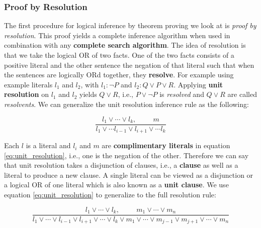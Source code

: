 

\subsubsection{Proof by Resolution}


The first procedure for logical inference by theorem proving we look at is \textit{proof by resolution}. This proof yields a complete inference algorithm when used in combination with any \textbf{complete search algorithm}. The idea of resolution is that we take the logical \textsc{OR} of two facts. One of the two facts consists of a positive literal and the other sentence the negation of that literal such that when the sentences are logically \textsc{OR}d together, they \textbf{resolve}.
For example using example literals $l_1$ and $l_2$, with $l_1: \neg P$ and $l_2: Q \vee P \vee R$. Applying \textbf{unit resolution} on $l_1$ and $l_2$ yields $Q \vee R$, i.e., $P \vee \neg P$ is \textit{resolved} and $Q \vee R$ are called \textit{resolvents}.
We can generalize the unit resolution inference rule as the following:

\begin{equation}
	\dfrac{l_1 \vee \cdots \vee l_k,\hspace{1cm}  m}{l_1 \vee \cdots l_{i-1} \vee l_{i+1} \vee \cdots l_k}
	\label{eq:unit_resolution}
\end{equation}

Each $l$ is a literal and $l_i$ and $m$ are \textbf{complimentary literals} in equation \ref{eq:unit_resolution}, i.e., one is the negation of the other. Therefore we can say that unit resolution takes a disjunction of clauses, i.e., a \textbf{clause} as well as a literal to produce a new clause. A single literal can be viewed as a disjunction or a logical \textsc{OR} of one literal which is also known as a \textbf{unit clause}. We use equation \ref{eq:unit_resolution} to generalize to the full resolution rule:

\begin{equation}
\dfrac{ l_1 \vee \cdots \vee l_k,\hspace{1cm}  m_1 \vee \cdots \vee m_n}{    l_1 \vee \cdots \vee l_{i-1} \vee l_{i+1} \vee \cdots \vee l_k  \vee m_1 \vee \cdots \vee m_{j-1} \vee m_{j+1} \vee \cdots \vee m_n }
\label{eq:full_resolution}
\end{equation}

